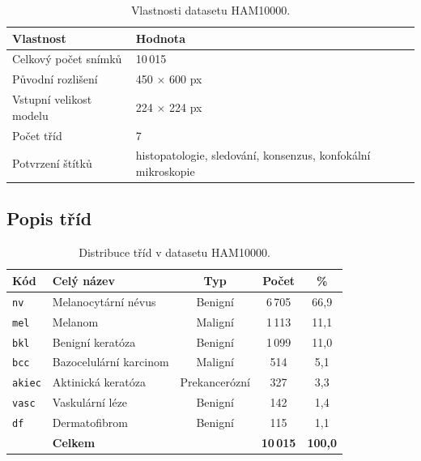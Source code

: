 \documentclass[12pt, a4paper]{article}
\begin{document}
\begin{table}[H]
    \centering
    \caption{Vlastnosti datasetu HAM10000.}
    \begin{tabular}{ll}
        \toprule
        \textbf{Vlastnost} & \textbf{Hodnota} \\
        \midrule
        Celkový počet snímků & 10\,015 \\
        Původní rozlišení & 450 $\times$ 600 px \\
        Vstupní velikost modelu & 224 $\times$ 224 px \\
        Počet tříd & 7 \\
        Potvrzení štítků & histopatologie, sledování, konsenzus, konfokální mikroskopie \\
        \bottomrule
    \end{tabular}
    \label{tab:dataset}
\end{table}

\subsection{Popis tříd}

\begin{table}[H]
    \centering
    \caption{Distribuce tříd v datasetu HAM10000.}
    \begin{tabular}{llccc}
        \toprule
        \textbf{Kód} & \textbf{Celý název} & \textbf{Typ} &
        \textbf{Počet} & \textbf{\%} \\
        \midrule
        \texttt{nv}    & Melanocytární névus      & Benigní        & 6\,705 & 66{,}9 \\
        \texttt{mel}   & Melanom                  & Maligní        & 1\,113 & 11{,}1 \\
        \texttt{bkl}   & Benigní keratóza         & Benigní        & 1\,099 & 11{,}0 \\
        \texttt{bcc}   & Bazocelulární karcinom   & Maligní        &   514  &  5{,}1 \\
        \texttt{akiec} & Aktinická keratóza       & Prekancerózní  &   327  &  3{,}3 \\
        \texttt{vasc}  & Vaskulární léze          & Benigní        &   142  &  1{,}4 \\
        \texttt{df}    & Dermatofibrom            & Benigní        &   115  &  1{,}1 \\
        \midrule
        & \textbf{Celkem} & & \textbf{10\,015} & \textbf{100{,}0} \\
        \bottomrule
    \end{tabular}
    \label{tab:classes}
\end{table}
\end{document}

